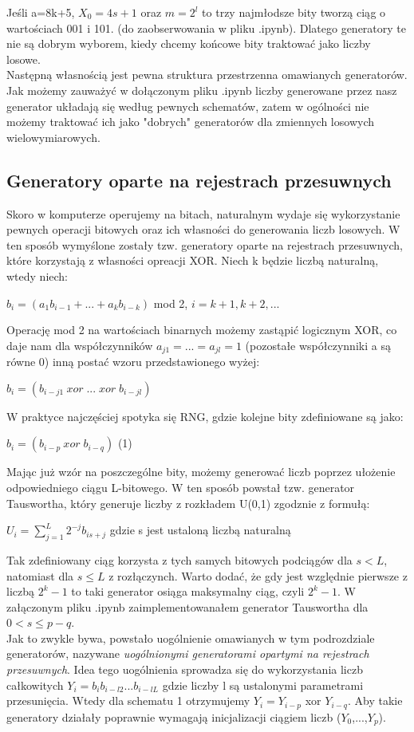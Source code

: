 \documentclass[a4paper]{scrartcl}
\begin{document}
Jeśli a=8k+5, $X_0=4s+1$ oraz $m=2^l$ to trzy najmłodsze bity tworzą ciąg o wartościach 001 i 101. (do zaobserwowania w pliku .ipynb). Dlatego generatory te nie są dobrym wyborem, kiedy chcemy końcowe bity traktować jako liczby losowe.\\
\null\qquad Następną własnością jest pewna struktura przestrzenna omawianych generatorów. Jak możemy zauważyć w dołączonym pliku .ipynb liczby generowane przez nasz generator układają się według pewnych schematów, zatem w ogólności nie możemy traktować ich jako "dobrych" \space generatorów dla zmiennych losowych wielowymiarowych.\\
\subsection{Generatory oparte na rejestrach przesuwnych}
\qquad Skoro w komputerze operujemy na bitach, naturalnym wydaje się wykorzystanie pewnych operacji bitowych oraz ich własności do generowania liczb losowych. W ten sposób wymyślone zostały tzw. generatory oparte na rejestrach przesuwnych, które korzystają z własności opreacji XOR. Niech k będzie liczbą naturalną, wtedy niech:
\begin{center}
$b_i=(a_1b_{i-1}+...+a_kb_{i-k})$ mod 2, $i=k+1, k+2,...$
\end{center}
Operację mod 2 na wartościach binarnych możemy zastąpić logicznym XOR, co daje nam dla współczynników $a_{j1}=...=a_{jl}=1$ (pozostałe współczynniki a są równe 0) inną postać wzoru przedstawionego wyżej:
\begin{center}
$b_i=(b_{i-j1}\:xor\;...\;xor\;b_{i-jl})$
\end{center}
W praktyce najczęściej spotyka się RNG, gdzie kolejne bity zdefiniowane są jako:
\begin{center}
$b_i=(b_{i-p}\:xor\;b_{i-q})$ (1)
\end{center}
Mając już wzór na poszczególne bity, możemy generować liczb poprzez ułożenie odpowiedniego ciągu L-bitowego. W ten sposób powstał tzw. generator Tauswortha, który generuje liczby z rozkładem U(0,1) zgodznie z formułą:
\begin{center}
$U_i=\sum_{j=1}^L2^{-j}b_{is+j}$ gdzie s jest ustaloną liczbą naturalną
\end{center}
Tak zdefiniowany ciąg korzysta z tych samych bitowych podciągów dla $s<L$, natomiast dla $s \leq L$ z rozłączynch. Warto dodać, że gdy jest względnie pierwsze z liczbą $2^k-1$ to taki generator osiąga maksymalny ciąg, czyli $2^k-1$. W załączonym pliku .ipynb zaimplementowanałem generator Tauswortha dla $0<s\leq p-q$.\\
\null\qquad Jak to zwykle bywa, powstało uogólnienie omawianych w tym podrozdziale generatorów, nazywane \textit{uogólnionymi generatorami opartymi na rejestrach przesuwnych}. Idea tego uogólnienia sprowadza się do wykorzystania liczb całkowitych $Y_i=b_ib_{i-l2}...b_{i-lL}$ gdzie liczby l są ustalonymi parametrami przesunięcia. Wtedy dla schematu 1 otrzymujemy $Y_i=Y_{i-p}$ xor $Y_{i-q}$. Aby takie generatory działały poprawnie wymagają inicjalizacji ciągiem liczb ($Y_0$,...,$Y_p$).
\end{document}
